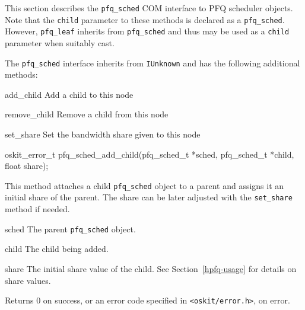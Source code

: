 This section describes the \texttt{pfq_sched} COM interface to PFQ
scheduler objects.
Note that the \texttt{child} parameter to these methods is declared
as a \texttt{pfq_sched}.
However, \texttt{pfq_leaf} inherits from \texttt{pfq_sched} and thus
may be used as a \texttt{child} parameter when suitably cast.

The \texttt{pfq_sched} interface inherits from \texttt{IUnknown} and
has the following additional methods:
\begin{icsymlist}
	\item[add_child]	Add a child to this node
	\item[remove_child]	Remove a child from this node
	\item[set_share]	Set the bandwidth share given to this node
\end{icsymlist}

\begin{apisyn}

	\funcproto oskit_error_t pfq_sched_add_child(pfq_sched_t *sched,
				pfq_sched_t *child,
				float share);
\end{apisyn}
\begin{apidesc}
	This method attaches a child \texttt{pfq_sched} object to a
	parent and assigns it an initial share of the parent.
	The share can be later adjusted with the \texttt{set_share}
	method if needed.
\end{apidesc}
\begin{apiparm}
	\item[sched]
		The parent \texttt{pfq_sched} object.
	\item[child]
		The child being added.
	\item[share]
		The initial share value of the child.  See
		Section~\ref{hpfq-usage} for details on share values.
\end{apiparm}
\begin{apiret}
	Returns 0 on success, or an error code specified in
	\texttt{<oskit/error.h>}, on error.
\end{apiret}

